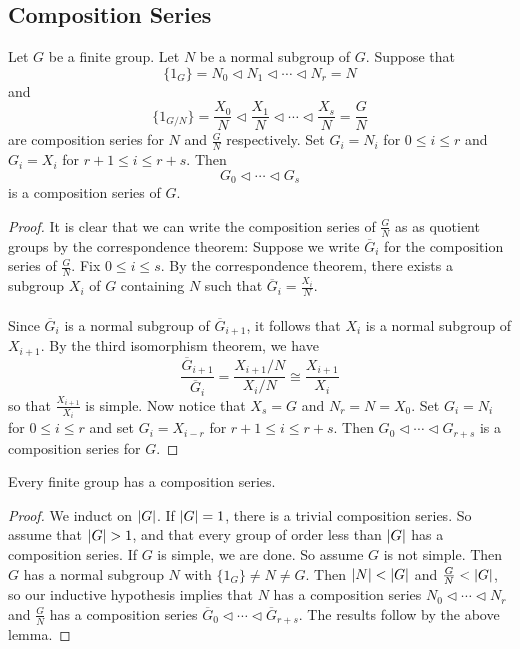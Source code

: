 \documentclass[a4paper]{article}
\begin{document}
\subsection{Composition Series}
\begin{lmm}{}{} Let $G$ be a finite group. Let $N$ be a normal subgroup of $G$. Suppose that $$\{1_G\}=N_0\triangleleft N_1\triangleleft\cdots\triangleleft N_r=N$$ and $$\{1_{G/N}\}=\frac{X_0}{N}\triangleleft\frac{X_1}{N}\triangleleft\cdots\triangleleft\frac{X_s}{N}=\frac{G}{N}$$ are composition series for $N$ and $\frac{G}{N}$ respectively. Set $G_i=N_i$ for $0\leq i\leq r$ and $G_i=X_i$ for $r+1\leq i\leq r+s$. Then $$G_0\triangleleft\cdots\triangleleft G_s$$ is a composition series of $G$. \tcbline
\begin{proof}
It is clear that we can write the composition series of $\frac{G}{N}$ as as quotient groups by the correspondence theorem: Suppose we write $\overline{G}_i$ for the composition series of $\frac{G}{N}$. Fix $0\leq i\leq s$. By the correspondence theorem, there exists a subgroup $X_i$ of $G$ containing $N$ such that $\overline{G}_i=\frac{X_i}{N}$. \\~\\

Since $\overline{G}_i$ is a normal subgroup of $\overline{G}_{i+1}$, it follows that $X_i$ is a normal subgroup of $X_{i+1}$. By the third isomorphism theorem, we have $$\frac{\overline{G}_{i+1}}{\overline{G}_i}=\frac{X_{i+1}/N}{X_i/N}\cong\frac{X_{i+1}}{X_i}$$ so that $\frac{X_{i+1}}{X_i}$ is simple. Now notice that $X_s=G$ and $N_r=N=X_0$. Set $G_i=N_i$ for $0\leq i\leq r$ and set $G_i=X_{i-r}$ for $r+1\leq i\leq r+s$. Then $G_0\triangleleft\cdots\triangleleft G_{r+s}$ is a composition series for $G$.
\end{proof}
\end{lmm}


\begin{prp}{}{} Every finite group has a composition series. \tcbline
\begin{proof}
We induct on $\abs{G}$. If $\abs{G}=1$, there is a trivial composition series. So assume that $\abs{G}>1$, and that every group of order less than $\abs{G}$ has a composition series. If $G$ is simple, we are done. So assume $G$ is not simple. Then $G$ has a normal subgroup $N$ with $\{1_G\}\neq N\neq G$. Then $\abs{N}<\abs{G}$ and $\frac{G}{N}<\abs{G}$, so our inductive hypothesis implies that $N$ has a composition series $N_0\triangleleft\cdots\triangleleft N_r$ and $\frac{G}{N}$ has a composition series $\overline{G}_0\triangleleft\cdots\triangleleft\overline{G}_{r+s}$. The results follow by the above lemma. 
\end{proof}
\end{prp}
\end{document}
